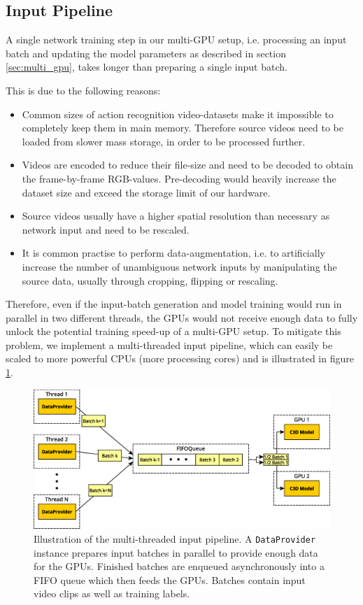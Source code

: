 \subsection{Input Pipeline}
\label{subsec:inputpipeline}
A single network training step in our multi-GPU setup, i.e. processing an input batch and updating the model parameters as described in section \ref{sec:multi_gpu}, takes longer than preparing a single input batch.

This is due to the following reasons:
\begin{itemize}
    \item 
    Common sizes of action recognition video-datasets make it impossible to completely keep them in main memory.
    Therefore source videos need to be loaded from slower mass storage, in order to be processed further.
    \item 
    Videos are encoded to reduce their file-size and need to be decoded to obtain the frame-by-frame RGB-values.
    Pre-decoding would heavily increase the dataset size and exceed the storage limit of our hardware.
    \item
    Source videos usually have a higher spatial resolution than necessary as network input and need to be rescaled.
    \item
    It is common practise to perform data-augmentation, i.e. to artificially increase the number of unambiguous network inputs by manipulating the source data, usually through cropping, flipping or rescaling.
\end{itemize}

Therefore, even if the input-batch generation and model training would run in parallel in two different threads, the GPUs would not receive enough data to fully unlock the potential training speed-up of a multi-GPU setup.
To mitigate this problem, we implement a multi-threaded input pipeline, which can easily be scaled to more powerful CPUs (more processing cores) and is illustrated in figure \ref{fig:input_pipeline}.

\begin{figure}[H]
    \centering
    \includegraphics[width=\textwidth]{img_approach/input_pipeline.eps}
    \caption{Illustration of the multi-threaded input pipeline. A \texttt{DataProvider} instance prepares input batches in parallel to provide enough data for the GPUs. Finished batches are enqueued asynchronously into a FIFO queue which then feeds the GPUs. Batches contain input video clips as well as training labels.}
    \label{fig:input_pipeline}
\end{figure}

